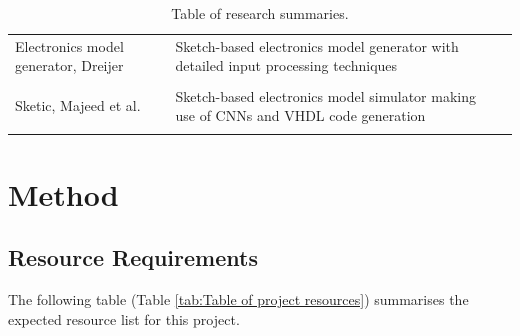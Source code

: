 \documentclass[11pt]{article}
\begin{document}
\begin{table}[htpb]
\begin{tabular}{
        @{}
        l
        >{\raggedright\arraybackslash}p{7cm}
        l
        @{}
        }
        Electronics model generator, Dreijer \cite{dreijer}    &
        Sketch-based electronics model generator with detailed
        input processing techniques                              \\
        \\

        Sketic, Majeed et al. \cite{191016}                    &
        Sketch-based electronics model simulator making use of
        \gls{CNN}s and VHDL code generation                      \\
        \\
    \end{tabular}
    \caption[Table of research summaries]{
        Table of research summaries.}
    \label{tab:Table of research summaries}
\end{table}


\pagebreak
\section{Method}
\label{sec:Method}

\subsection{Resource Requirements}
\label{subsec:Resource Requirements}

The following table (Table \ref{tab:Table of project resources}) summarises the expected resource list for this
project.
\end{document}
